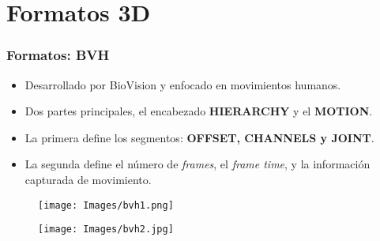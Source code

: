 \documentclass{beamer}
\begin{document}
\section{Formatos 3D}

\begin{frame}
\frametitle{Formatos: BVH}
\begin{itemize}
\item Desarrollado por BioVision y enfocado en movimientos humanos.
\item Dos partes principales, el encabezado \textbf{HIERARCHY} y el \textbf{MOTION}.
\item La primera define los segmentos: \textbf{OFFSET, CHANNELS y JOINT}.
\item La segunda define el n\' umero de \textit{frames}, el \textit{frame time}, y la informaci\' on capturada de movimiento.
\end{itemize}
\begin{figure}[hbtp]
\centering
\texttt{[image: Images/bvh1.png]}
\end{figure}
\end{frame}
\begin{frame}
\begin{figure}[hbtp]
\centering
\texttt{[image: Images/bvh2.jpg]}
\end{figure}
\end{frame}
\end{document}
